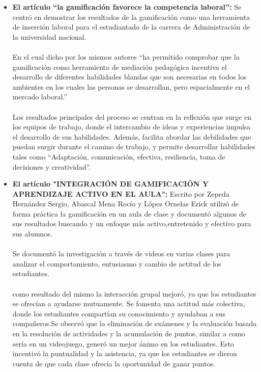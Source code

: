 \begin{itemize}
    \item \textbf{El artículo “la gamificación favorece la competencia laboral”:} Se centró en demostrar los resultados de la gamificación como una herramienta de inserción laboral para el estudiantado de la carrera de Administración de la universidad nacional.
    \\ \\
En el cual dicho por los mismos autores “ha permitido comprobar que la gamificación como herramienta de mediación pedagógica incentiva el desarrollo de diferentes habilidades blandas que son necesarias en todos los ambientes en los cuales las personas se desarrollan, pero espacialmente en el mercado laboral.”
\\ \\
Los resultados principales del proceso se centran en la reflexión que surge en los equipos de trabajo, donde el intercambio de ideas y experiencias impulsa el desarrollo de sus habilidades. Además, facilita abordar las debilidades que puedan surgir durante el camino de trabajo, y permite desarrollar habilidades tales como “Adaptación, comunicación, efectiva, resiliencia, toma de decisiones y creatividad”.\cite{m}

    \item \textbf{El artículo "INTEGRACIÓN DE GAMIFICACIÓN Y APRENDIZAJE ACTIVO EN EL AULA":}
    Escrito por Zepeda Hernández Sergio, Abascal Mena Rocío y López  Ornelas Erick utilizó de forma práctica la gamificación en un aula de clase y documentó algunos de sus resultados buscando y un enfoque más activo,entretenido y efectivo para sus alumnos.
    \\ \\
Se documentó la investigación a través de videos en varias clases para analizar el comportamiento, entusiasmo y cambio de actitud de los estudiantes.
\\ \\
como resultado del mismo la interacción grupal mejoró, ya que los estudiantes se ofrecían a ayudarse mutuamente. Se fomenta una actitud más colectiva, donde los estudiantes compartían su conocimiento y ayudaban a sus compañeros.Se observó que la eliminación de exámenes y la evaluación basada en la resolución de actividades y la acumulación de puntos, similar a como sería en un videojuego, generó un mejor ánimo en los estudiantes. Esto incentivó la puntualidad y la asistencia, ya que los estudiantes se dieron cuenta de que cada clase ofrecía la oportunidad de ganar puntos.\cite{j}


\end{itemize}

